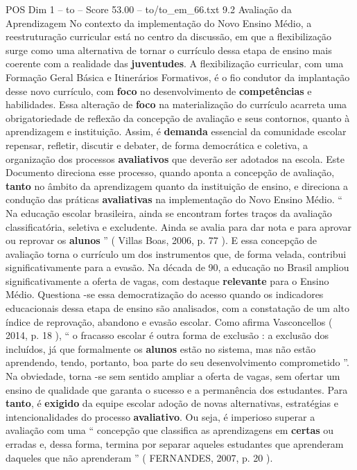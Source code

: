 \begin{textsample}{POS Dim 1 – to – Score 53.00 – to/to\_em\_66.txt}  \label{ex:f1_pos_255}
9.2 Avaliação da Aprendizagem No contexto da implementação do Novo Ensino Médio, a reestruturação curricular está no centro da discussão, em que a flexibilização surge como uma alternativa de tornar o currículo dessa etapa de ensino mais coerente com a realidade das \textbf{juventudes}.
A flexibilização curricular, com uma Formação Geral Básica e Itinerários Formativos, é o fio condutor da implantação desse novo currículo, com \textbf{foco} no desenvolvimento de \textbf{competências} e habilidades.
Essa alteração de \textbf{foco} na materialização do currículo acarreta uma obrigatoriedade de reflexão da concepção de avaliação e seus contornos, quanto à aprendizagem e instituição.
Assim, é \textbf{demanda} essencial da comunidade escolar repensar, refletir, discutir e debater, de forma democrática e coletiva, a organização dos processos \textbf{avaliativos} que deverão ser adotados na escola.
Este Documento direciona esse processo, quando aponta a concepção de avaliação, \textbf{tanto} no âmbito da aprendizagem quanto da instituição de ensino, e direciona a condução das práticas \textbf{avaliativas} na implementação do Novo Ensino Médio. “ Na educação escolar brasileira, ainda se encontram fortes traços da avaliação classificatória, seletiva e excludente.
Ainda se avalia para dar nota e para aprovar ou reprovar os \textbf{alunos} ” ( Villas Boas, 2006, p. 77 ).
E essa concepção de avaliação torna o currículo um dos instrumentos que, de forma velada, contribui significativamente para a evasão.
Na década de 90, a educação no Brasil ampliou significativamente a oferta de vagas, com destaque \textbf{relevante} para o Ensino Médio.
Questiona -se essa democratização do acesso quando os indicadores educacionais dessa etapa de ensino são analisados, com a constatação de um alto índice de reprovação, abandono e evasão escolar.
Como afirma Vasconcellos ( 2014, p. 18 ), “ o fracasso escolar é outra forma de exclusão : a exclusão dos incluídos, já que formalmente os \textbf{alunos} estão no sistema, mas não estão aprendendo, tendo, portanto, boa parte do seu desenvolvimento comprometido ”.
Na obviedade, torna -se sem sentido ampliar a oferta de vagas, sem ofertar um ensino de qualidade que garanta o sucesso e a permanência dos estudantes.
Para \textbf{tanto}, é \textbf{exigido} da equipe escolar adoção de novas alternativas, estratégias e intencionalidades do processo \textbf{avaliativo}.
Ou seja, é imperioso superar a avaliação com uma “ concepção que classifica as aprendizagens em \textbf{certas} ou erradas e, dessa forma, termina por separar aqueles estudantes que aprenderam daqueles que não aprenderam ” ( FERNANDES, 2007, p. 20 ).

\end{textsample}
